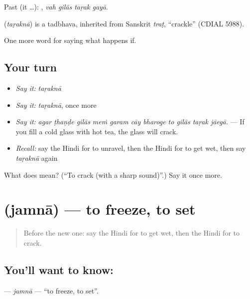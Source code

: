 Past (it …):    , \emph{vah gilās taṛak gayā}.

\begin{cousinweb}
\textbf{} (\emph{taṛaknā}) is a tadbhava, inherited from Sanskrit \emph{traṭ}, \textquotedblleft{}crackle\textquotedblright{} (CDIAL 5988).
\end{cousinweb}

\begin{grammarlens}[title={What you've built}]
One more word for saying what happens if.
\end{grammarlens}

\subsection*{Your turn}
\begin{itemize}
\raggedright
  \item \emph{Say it:} \emph{taṛaknā}
  \item \emph{Say it:} \emph{taṛaknā}, once more
  \item \emph{Say it:} \emph{agar ṭhaṇḍe gilās meṁ garam cāy bharoge to gilās taṛak jāegā.} — If you fill a cold glass with hot tea, the glass will crack.
  \item \emph{Recall:} say the Hindi for to unravel, then the Hindi for to get wet, then say \emph{taṛaknā} again
\end{itemize}

\begin{tcolorbox}[breakable,colback=teal!4,colframe=teal!35!black,title={Before you move on}]
What does  mean? (\textquotedblleft{}To crack (with a sharp sound)\textquotedblright{}.) Say it once more.
\end{tcolorbox}
\section[\texorpdfstring{\hi{जमना} (jamnā)}{जमना (jamnā)}]{ (jamnā) — to freeze, to set}

\label{lesson:HI-C384-jamna}



\begin{quote}
Before the new one: say the Hindi for to get wet, then the Hindi for to crack.
\end{quote}

\subsection*{You'll want to know: }
\textbf{} — \emph{jamnā} — \textquotedblleft{}to freeze, to set\textquotedblright{}.

